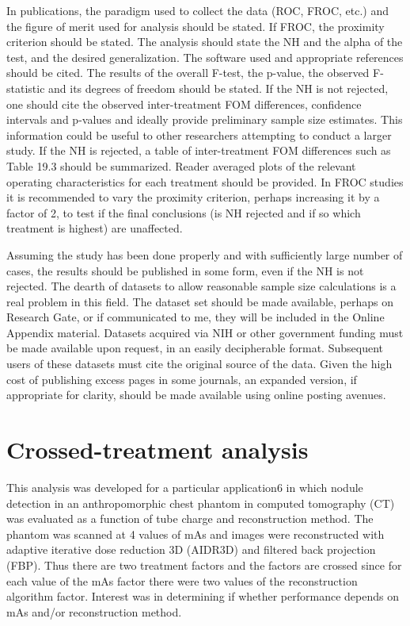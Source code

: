\documentclass[
]{book}
\begin{document}
In publications, the paradigm used to collect the data (ROC, FROC, etc.) and the figure of merit used for analysis should be stated. If FROC, the proximity criterion should be stated. The analysis should state the NH and the alpha of the test, and the desired generalization. The software used and appropriate references should be cited. The results of the overall F-test, the p-value, the observed F-statistic and its degrees of freedom should be stated. If the NH is not rejected, one should cite the observed inter-treatment FOM differences, confidence intervals and p-values and ideally provide preliminary sample size estimates. This information could be useful to other researchers attempting to conduct a larger study. If the NH is rejected, a table of inter-treatment FOM differences such as Table 19.3 should be summarized. Reader averaged plots of the relevant operating characteristics for each treatment should be provided. In FROC studies it is recommended to vary the proximity criterion, perhaps increasing it by a factor of 2, to test if the final conclusions (is NH rejected and if so which treatment is highest) are unaffected.

Assuming the study has been done properly and with sufficiently large number of cases, the results should be published in some form, even if the NH is not rejected. The dearth of datasets to allow reasonable sample size calculations is a real problem in this field. The dataset set should be made available, perhaps on Research Gate, or if communicated to me, they will be included in the Online Appendix material. Datasets acquired via NIH or other government funding must be made available upon request, in an easily decipherable format. Subsequent users of these datasets must cite the original source of the data. Given the high cost of publishing excess pages in some journals, an expanded version, if appropriate for clarity, should be made available using online posting avenues.

\hypertarget{crossed-treatment-analysis}{%
\section{Crossed-treatment analysis}\label{crossed-treatment-analysis}}

This analysis was developed for a particular application6 in which nodule detection in an anthropomorphic chest phantom in computed tomography (CT) was evaluated as a function of tube charge and reconstruction method. The phantom was scanned at 4 values of mAs and images were reconstructed with adaptive iterative dose reduction 3D (AIDR3D) and filtered back projection (FBP). Thus there are two treatment factors and the factors are crossed since for each value of the mAs factor there were two values of the reconstruction algorithm factor. Interest was in determining if whether performance depends on mAs and/or reconstruction method.
\end{document}
